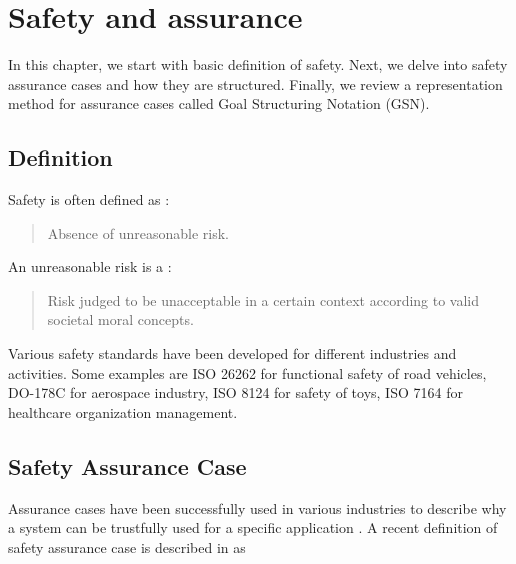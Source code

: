 \chapter{Safety and assurance}
\label{chap:safety}

In this chapter, we start with basic definition of safety. Next, we delve into safety assurance cases and how they are structured. Finally, we review a representation method for assurance cases called Goal Structuring Notation (GSN).

\section{Definition}

Safety is often defined as \cite{organization2018iso}:
\begin{quotation}
Absence of unreasonable risk.
\end{quotation}  
An unreasonable risk is a \cite{organization2018iso}:
\begin{quotation}
Risk judged to be unacceptable in a certain context according to valid societal moral concepts.
\end{quotation}
Various safety standards have been developed for different industries and activities. Some examples are ISO 26262 for functional safety of road vehicles, DO-178C for aerospace industry, ISO 8124 for safety of toys, ISO 7164 for healthcare organization management.

\section{Safety Assurance Case}

Assurance cases have been successfully used in various industries to describe why a system can be trustfully used for a specific application \cite{Ashmore2021}.
A recent definition of safety assurance case is described in \cite{Bloomfield2010} as


